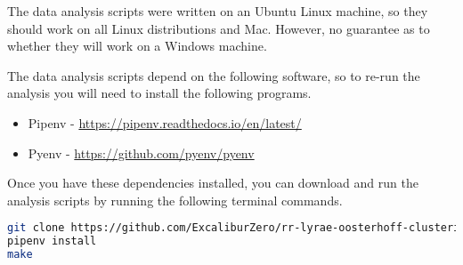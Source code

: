 \documentclass[]{article}
\begin{document}
\vspace{12pt}

The data analysis scripts were written on an Ubuntu Linux machine, so they should work on all Linux distributions and Mac. However, no guarantee as to whether they will work on a Windows machine.

\vspace{12pt}

The data analysis scripts depend on the following software, so to re-run the analysis you will need to install the following programs.

\begin{itemize}
	\item Pipenv	-	\url{https://pipenv.readthedocs.io/en/latest/}
	\item Pyenv		-	\url{https://github.com/pyenv/pyenv}
\end{itemize}

Once you have these dependencies installed, you can download and run the analysis scripts by running the following terminal commands.

\vspace{12pt}

\begin{lstlisting}[language=bash]
git clone https://github.com/ExcaliburZero/rr-lyrae-oosterhoff-clustering
pipenv install
make
\end{lstlisting}
\end{document}
